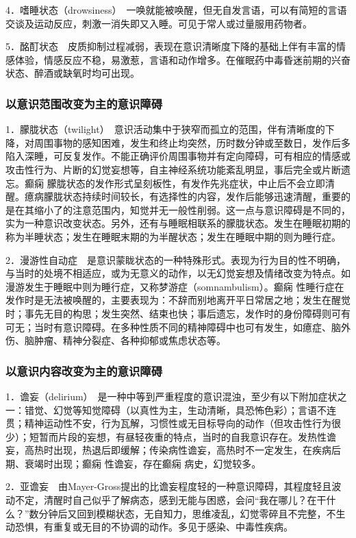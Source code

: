 4．嗜睡状态（drowsiness）　一唤就能被唤醒，但无自发言语，可以有简短的言语交谈及运动反应，刺激一消失即又入睡。可见于常人或过量服用药物者。

5．酩酊状态　皮质抑制过程减弱，表现在意识清晰度下降的基础上伴有丰富的情感体验，情感反应不稳，易激惹，言语和动作增多。在催眠药中毒昏迷前期的兴奋状态、醉酒或缺氧时均可出现。

\subsubsection{以意识范围改变为主的意识障碍}

1．朦胧状态（twilight）　意识活动集中于狭窄而孤立的范围，伴有清晰度的下降，对周围事物的感知困难，发生和终止均突然，历时数分钟或至数日，发作后多陷入深睡，可反复发作。不能正确评价周围事物并有定向障碍，可有相应的情感或攻击性行为、片断的幻觉妄想等，自主神经系统功能紊乱明显，事后完全或片断遗忘。癫痫
朦胧状态的发作形式呈刻板性，有发作先兆症状，中止后不会立即清醒。癔病朦胧状态持续时间较长，有选择性的内容，发作后能够迅速清醒，重要的是在其缩小了的注意范围内，知觉并无一般性削弱。这一点与意识障碍是不同的，实为一种意识改变状态。另外，还有与睡眠相联系的朦胧状态。发生在睡眠初期的称为半睡状态；发生在睡眠末期的为半醒状态；发生在睡眠中期的则为睡行症。

2．漫游性自动症　是意识蒙眬状态的一种特殊形式。表现为行为目的性不明确，与当时的处境不相适应，或为无意义的动作，以无幻觉妄想及情绪改变为特点。如漫游发生于睡眠中则为睡行症，又称梦游症（somnambulism）。癫痫
性睡行症在发作时是无法被唤醒的，主要表现为：不辞而别地离开平日常居之地；发生在醒觉时；事先无目的构思；发生突然、结束也快；事后遗忘，发作时的身份障碍则可有可无；当时有意识障碍。在多种性质不同的精神障碍中也可有发生，如癔症、脑外伤、脑肿瘤、精神分裂症、各种抑郁或焦虑状态等。

\subsubsection{以意识内容改变为主的意识障碍}

1．谵妄（delirium）　是一种中等到严重程度的意识混浊，至少有以下附加症状之一：错觉、幻觉等知觉障碍（以真性为主，生动清晰，具恐怖色彩）；言语不连贯；精神运动性不安，行为瓦解，习惯性或无目标导向的动作（但攻击性行为很少）；短暂而片段的妄想，有昼轻夜重的特点，当时的自我意识存在。发热性谵妄，高热时出现，热退后即缓解；传染病性谵妄，高热时不一定发生，在疾病后期、衰竭时出现；癫痫
性谵妄，存在癫痫 病史，幻觉较多。

2．亚谵妄　由Mayer-Gross提出的比谵妄程度轻的一种意识障碍，其程度轻且波动不定，清醒时自己似乎了解病态，感到无能与困惑，会问“我在哪儿？在干什么？”数分钟后又回到模糊状态，无自知力，思维凌乱，幻觉零碎且不完整，不生动恐惧，有重复或无目的不协调的动作。多见于感染、中毒性疾病。

